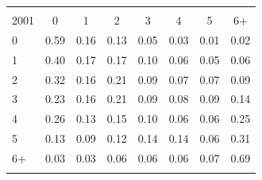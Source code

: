 \begin{tabular}{lccccccc}
\hline \noalign{\smallskip}\multicolumn{8}{c}{2002}\\
2001 & 0 & 1 & 2 & 3 & 4 & 5 & 6+\\
\noalign{\smallskip}\hline \noalign{\smallskip}0 & 0.59 & 0.16 & 0.13 & 0.05 & 0.03 & 0.01 & 0.02\\
1 & 0.40 & 0.17 & 0.17 & 0.10 & 0.06 & 0.05 & 0.06\\
2 & 0.32 & 0.16 & 0.21 & 0.09 & 0.07 & 0.07 & 0.09\\
3 & 0.23 & 0.16 & 0.21 & 0.09 & 0.08 & 0.09 & 0.14\\
4 & 0.26 & 0.13 & 0.15 & 0.10 & 0.06 & 0.06 & 0.25\\
5 & 0.13 & 0.09 & 0.12 & 0.14 & 0.14 & 0.06 & 0.31\\
6+ & 0.03 & 0.03 & 0.06 & 0.06 & 0.06 & 0.07 & 0.69\\
\noalign{\smallskip}\hline\end{tabular}
